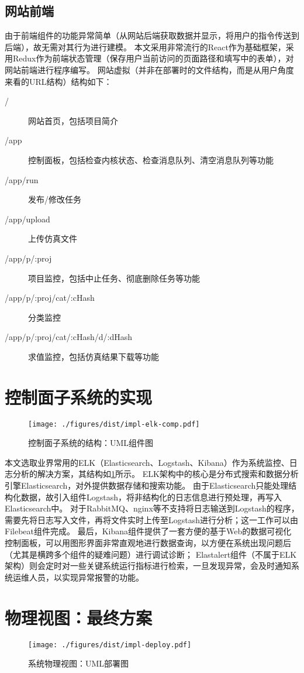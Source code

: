 \documentclass[index]{subfiles}
\begin{document}
\subsection{网站前端}
由于前端组件的功能异常简单（从网站后端获取数据并显示，将用户的指令传送到后端），故无需对其行为进行建模。
本文采用非常流行的React作为基础框架，采用Redux作为前端状态管理（保存用户当前访问的页面路径和填写中的表单），对网站前端进行程序编写。
网站虚拟（并非在部署时的文件结构，而是从用户角度来看的URL结构）结构如下：
\begin{description}
  \item[/] 网站首页，包括项目简介
  \item[/app] 控制面板，包括检查内核状态、检查消息队列、清空消息队列等功能
  \item[/app/run] 发布/修改任务
  \item[/app/upload] 上传仿真文件
  \item[/app/p/:proj] 项目监控，包括中止任务、彻底删除任务等功能
  \item[/app/p/:proj/cat/:cHash] 分类监控
  \item[/app/p/:proj/cat/:cHash/d/:dHash] 求值监控，包括仿真结果下载等功能
\end{description}

\section{控制面子系统的实现}\label{sec:impl-elk}
\begin{figure}[h]
  \centering
  \texttt{[image: ./figures/dist/impl-elk-comp.pdf]}
  \caption{控制面子系统的结构：UML组件图\label{fig:impl-elk-comp}}
\end{figure}
本文选取业界常用的ELK（Elasticsearch、Logstash、Kibana）作为系统监控、日志分析的解决方案，其结构如\cref{fig:impl-elk-comp}所示。
ELK架构中的核心是分布式搜索和数据分析引擎Elasticsearch，对外提供数据存储和搜索功能。
由于Elasticsearch只能处理结构化数据，故引入组件Logstash，将非结构化的日志信息进行预处理，再写入Elasticsearch中。
对于RabbitMQ、nginx等不支持将日志输送到Logstash的程序，需要先将日志写入文件，再将文件实时上传至Logstash进行分析；这一工作可以由Filebeat组件完成。
最后，Kibana组件提供了一套方便的基于Web的数据可视化控制面板，可以用图形界面非常直观地进行数据查询，以方便在系统出现问题后（尤其是横跨多个组件的疑难问题）进行调试诊断；
Elastalert组件（不属于ELK架构）则会定时对一些关键系统运行指标进行检索，一旦发现异常，会及时通知系统运维人员，以实现异常报警的功能。

\section{物理视图：最终方案}
\begin{figure}[h]
  \centering
  \texttt{[image: ./figures/dist/impl-deploy.pdf]}
  \caption{系统物理视图：UML部署图\label{fig:impl-deploy}}
\end{figure}
\end{document}
